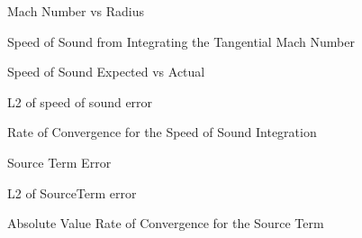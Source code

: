 \documentclass[a4paper]{article}
\begin{document}
\begin{figure}
    \begin{center}
        \scalebox{0.75}{}
    \end{center}
    \caption{Mach Number vs Radius}
\end{figure}

\begin{figure}
    \begin{center}
        \scalebox{0.75}{}
    \end{center}
    \caption{Speed of Sound from Integrating the Tangential Mach Number}
\end{figure}

\begin{figure}
    \begin{center}
        \scalebox{0.75}{}
    \end{center}
    \caption{Speed of Sound Expected vs Actual}
\end{figure}

\begin{figure}
    \begin{center}
        \scalebox{0.75}{}
    \end{center}
    \caption{L2 of speed of sound error}
\end{figure}


\begin{figure}
    \begin{center}
        \scalebox{0.75}{}
    \end{center}
    \caption{Rate of Convergence for the Speed of Sound Integration}
\end{figure}

\begin{figure}
    \begin{center}
        \scalebox{0.75}{}
    \end{center}
    \caption{Source Term Error}
\end{figure}

\begin{figure}
    \begin{center}
        \scalebox{0.75}{}
    \end{center}
    \caption{L2 of SourceTerm error}
\end{figure}

\begin{figure}
    \begin{center}
        \scalebox{0.75}{}
    \end{center}
    \caption{Absolute Value Rate of Convergence for the Source Term}
\end{figure}
\end{document}
